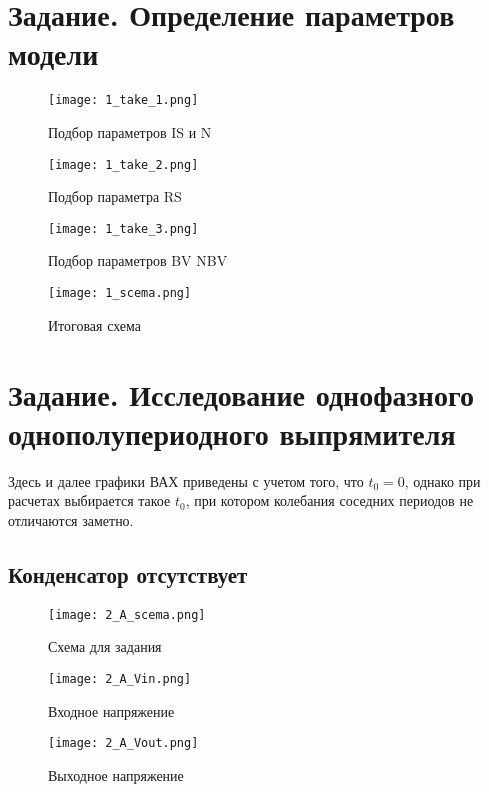 \documentclass[a4paper,14pt]{article}
\begin{document}


\section{Задание. Определение параметров модели}

\begin{figure}[H]
	\centering
	\texttt{[image: 1\_take\_1.png]}
	\caption{Подбор параметров IS и N}	
\end{figure}

\begin{figure}[H]
	\centering
	\texttt{[image: 1\_take\_2.png]}
	\caption{Подбор параметра RS}	
\end{figure}

\begin{figure}[H]
	\centering
	\texttt{[image: 1\_take\_3.png]}
	\caption{Подбор параметров BV NBV}	
\end{figure}

\begin{figure}[H]
	\centering
	\texttt{[image: 1\_scema.png]}
	\caption{Итоговая схема}	
\end{figure}

\section{Задание. Исследование однофазного однополупериодного выпрямителя}

Здесь и далее графики ВАХ приведены с учетом того, что $t_0 = 0$, однако при расчетах выбирается такое $t_0$, при котором колебания соседних периодов не отличаются заметно.

\subsection{Конденсатор отсутствует}
\begin{figure}[H]
	\centering
	\texttt{[image: 2\_A\_scema.png]}
	\caption{Схема для задания}	
\end{figure}

\begin{figure}[H]
	\centering
	\texttt{[image: 2\_A\_Vin.png]}
	\caption{Входное напряжение}	
\end{figure}

\begin{figure}[H]
	\centering
	\texttt{[image: 2\_A\_Vout.png]}
	\caption{Выходное напряжение}	
\end{figure}
\end{document}
